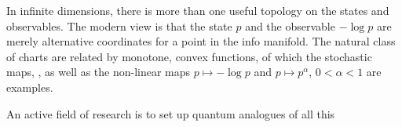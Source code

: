 In infinite dimensions, there is more than one useful topology
on the states and observables.
The modern view \cite{Pistone} is that the state $p$ and the observable
$-\log p$ are merely alternative coordinates for a point
in the info manifold. The natural class of charts are
related by monotone, convex functions, of which the stochastic maps,
\cite{Chentsov}, as well as the non-linear maps $p\mapsto-\log p$ and
$p\mapsto p^\alpha$, $0<\alpha<1$ are examples.

An active field of research is to set up quantum analogues of all this
\cite{Petz,Ray4,Ray5,Ray6} 



